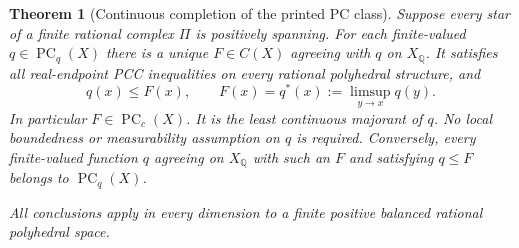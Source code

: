 \documentclass[11pt]{article}
\newtheorem{theorem}{Theorem}
\newcommand{\Q}{\mathbb Q}
\newcommand{\PC}{\operatorname{PC}}
\begin{document}
\begin{theorem}[Continuous completion of the printed PC class]\label{completion}
Suppose every star of a finite rational complex $\Pi$ is positively spanning. For each finite-valued $q\in\PC_q(X)$ there is a unique $F\in C(X)$ agreeing with $q$ on $X_\Q$. It satisfies all real-endpoint PCC inequalities on every rational polyhedral structure, and
\begin{equation}\label{hull}
 q(x)\leq F(x),\qquad F(x)=q^*(x):=\limsup_{y\to x}q(y).
\end{equation}
In particular $F\in\PC_c(X)$. It is the least continuous majorant of $q$. No local boundedness or measurability assumption on $q$ is required. Conversely, every finite-valued function $q$ agreeing on $X_\Q$ with such an $F$ and satisfying $q\leq F$ belongs to $\PC_q(X)$.

All conclusions apply in every dimension to a finite positive balanced rational polyhedral space.
\end{theorem}
\end{document}
